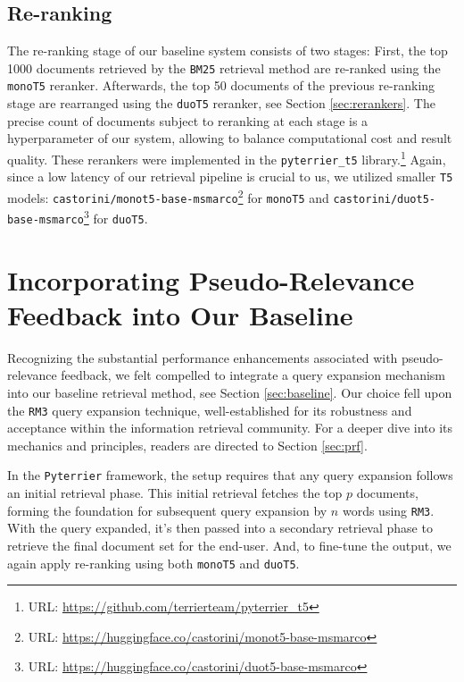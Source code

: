 \documentclass[sigconf]{acmart}
\begin{document}
\subsection{Re-ranking}
The re-ranking stage of our baseline system consists of two stages: First, the top 1000 documents retrieved by the \texttt{BM25} retrieval method are re-ranked using the \texttt{monoT5} reranker. Afterwards, the top 50 documents of the previous re-ranking stage are rearranged using the \texttt{duoT5} reranker, see Section \ref{sec:rerankers}. The precise count of documents subject to reranking at each stage is a hyperparameter of our system, allowing to balance computational cost and result quality. These rerankers were implemented in the \texttt{pyterrier\_t5} library.\footnote{URL: \url{https://github.com/terrierteam/pyterrier_t5}} Again, since a low latency of our retrieval pipeline is crucial to us, we utilized smaller \texttt{T5} models: \texttt{castorini\-/monot5\--base\--msmarco}\footnote{URL: \url{https://huggingface.co/castorini/monot5-base-msmarco}} for \texttt{monoT5} and \texttt{castorini\-/duot5\--base\--msmarco}\footnote{URL: \url{https://huggingface.co/castorini/duot5-base-msmarco}} for \texttt{duoT5}.

\section{Incorporating Pseudo-Relevance Feedback into Our Baseline}\label{sec:baseline+rm3}
Recognizing the substantial performance enhancements associated with pseudo-relevance feedback, we felt compelled to integrate a query expansion mechanism into our baseline retrieval method, see Section \ref{sec:baseline}. Our choice fell upon the \texttt{RM3} query expansion technique, well-established for its robustness and acceptance within the information retrieval community. For a deeper dive into its mechanics and principles, readers are directed to Section \ref{sec:prf}.

In the \texttt{Pyterrier} framework, the setup requires that any query expansion follows an initial retrieval phase. This initial retrieval fetches the top $p$ documents, forming the foundation for subsequent query expansion by $n$ words using \texttt{RM3}. With the query expanded, it's then passed into a secondary retrieval phase to retrieve the final document set for the end-user. And, to fine-tune the output, we again apply re-ranking using both \texttt{monoT5} and \texttt{duoT5}.
\end{document}
